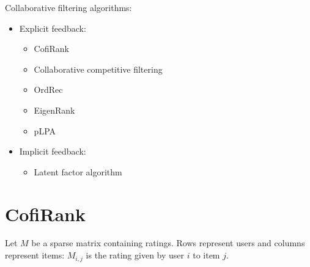 \documentclass[a4paper]{article}
\begin{document}
Collaborative filtering algorithms:
\begin{itemize}
  \item Explicit feedback:
    \begin{itemize}
      \item CofiRank \cite{weimer2007cofi}
      \item Collaborative competitive filtering \cite{yang2011collaborative}
      \item OrdRec \cite{koren2011ordrec}
      \item EigenRank \cite{liu2008eigenrank}
      \item pLPA \cite{liu2009probabilistic}
    \end{itemize}
  \item Implicit feedback:
    \begin{itemize}
      \item Latent factor algorithm \cite{hu2008collaborative}
    \end{itemize}
\end{itemize}

\section{CofiRank}
\label{sec:CofiRank}

Let $M$ be a sparse matrix containing ratings. Rows represent users and columns
represent items: $M_{i,j}$ is the rating given by user $i$ to item $j$.



\end{document}

